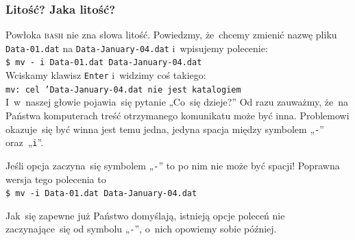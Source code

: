 \documentclass[10pt,t]{beamer}
\begin{document}
\begin{frame}
  \frametitle{Litość? Jaka litość?}


  Powłoka \textsc{bash} nie zna słowa litość. Powiedzmy, że~chcemy
  zmienić nazwę pliku \texttt{Data-01.dat} na \texttt{Data-January-04.dat}
  i~wpisujemy polecenie: \\
  \texttt{\$ mv - i Data-01.dat Data-January-04.dat} \\
  Wciskamy klawisz \texttt{Enter} i~widzimy coś takiego: \\
  \texttt{mv: cel 'Data-January-04.dat nie jest katalogiem} \\
  I~w~naszej głowie pojawia~się pytanie „Co~się dzieje?” Od razu zauważmy,
  że~na Państwa komputerach treść otrzymanego komunikatu może być inna.
  Problemowi okazuje~się być winna jest temu jedna, jedyna spacja między
  symbolem „\texttt{-}” oraz~„\texttt{i}”.

  Jeśli opcja zaczyna~się symbolem „\texttt{-}” to po nim
  \alert{nie może być spacji}! Poprawna wersja tego polecenia to \\
  \texttt{\$ mv -i Data-01.dat Data-January-04.dat}

  Jak~się zapewne już Państwo domyślają, istnieją opcje poleceń nie
  zaczynające~się od symbolu „\texttt{-}”, o~nich opowiemy sobie później.

\end{frame}
\end{document}
